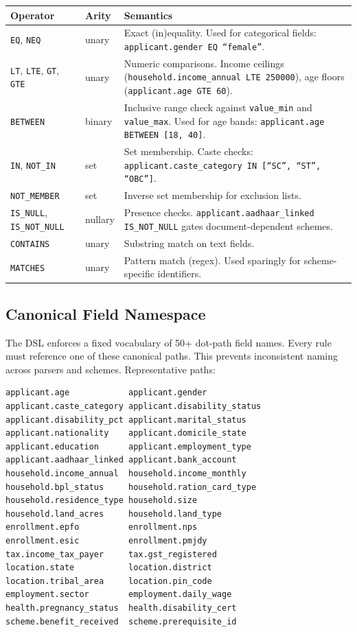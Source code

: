 \documentclass[11pt,a4paper]{article}
\newcommand{\ic}[1]{\texttt{\color{accent}#1}}
\begin{document}
\begin{center}
\small
\begin{tabular}{@{}llp{7.8cm}@{}}
\toprule
\textbf{Operator} & \textbf{Arity} & \textbf{Semantics} \\
\midrule
\ic{EQ}, \ic{NEQ}           & unary   & Exact (in)equality. Used for categorical fields: \ic{applicant.gender EQ ``female''}. \\
\ic{LT}, \ic{LTE}, \ic{GT}, \ic{GTE} & unary   & Numeric comparisons. Income ceilings (\ic{household.income\_annual LTE 250000}), age floors (\ic{applicant.age GTE 60}). \\
\ic{BETWEEN}                 & binary  & Inclusive range check against \ic{value\_min} and \ic{value\_max}. Used for age bands: \ic{applicant.age BETWEEN [18, 40]}. \\
\ic{IN}, \ic{NOT\_IN}       & set     & Set membership. Caste checks: \ic{applicant.caste\_category IN [``SC'', ``ST'', ``OBC'']}. \\
\ic{NOT\_MEMBER}             & set     & Inverse set membership for exclusion lists. \\
\ic{IS\_NULL}, \ic{IS\_NOT\_NULL} & nullary & Presence checks. \ic{applicant.aadhaar\_linked IS\_NOT\_NULL} gates document-dependent schemes. \\
\ic{CONTAINS}                & unary   & Substring match on text fields. \\
\ic{MATCHES}                 & unary   & Pattern match (regex). Used sparingly for scheme-specific identifiers. \\
\bottomrule
\end{tabular}
\end{center}

\subsection{Canonical Field Namespace}

The DSL enforces a fixed vocabulary of 50+ dot-path field names. Every rule must reference one of these canonical paths. This prevents inconsistent naming across parsers and schemes. Representative paths:

\begin{lstlisting}[basicstyle=\ttfamily\footnotesize\color{codefg}, frame=none, xleftmargin=1em]
applicant.age            applicant.gender
applicant.caste_category applicant.disability_status
applicant.disability_pct applicant.marital_status
applicant.nationality    applicant.domicile_state
applicant.education      applicant.employment_type
applicant.aadhaar_linked applicant.bank_account
household.income_annual  household.income_monthly
household.bpl_status     household.ration_card_type
household.residence_type household.size
household.land_acres     household.land_type
enrollment.epfo          enrollment.nps
enrollment.esic          enrollment.pmjdy
tax.income_tax_payer     tax.gst_registered
location.state           location.district
location.tribal_area     location.pin_code
employment.sector        employment.daily_wage
health.pregnancy_status  health.disability_cert
scheme.benefit_received  scheme.prerequisite_id
\end{lstlisting}
\end{document}
